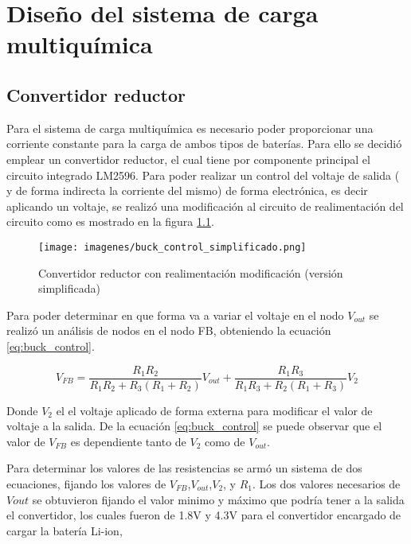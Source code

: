 \chapter{Diseño del sistema de carga multiquímica}

\section{Convertidor reductor}

Para el sistema de carga multiquímica es necesario poder proporcionar una 
corriente constante para la carga de ambos tipos de baterías. Para ello
se decidió emplear un convertidor reductor, el cual tiene por componente principal
el circuito integrado LM2596. Para poder realizar un control del voltaje de salida ( y de
forma indirecta la corriente del mismo)
de forma electrónica, es decir aplicando un voltaje, se realizó una modificación al circuito
de realimentación del circuito como es mostrado en la figura \ref{fig:buck_modificado}.

\begin{figure}[H]
    \centering
    \texttt{[image: imagenes/buck\_control\_simplificado.png]}
    \caption{Convertidor reductor con realimentación modificación (versión simplificada) }
    \label{fig:buck_modificado}
\end{figure}

Para poder determinar en que forma va a variar el voltaje en el nodo $V_{out}$ se realizó un 
análisis de nodos en el nodo FB, obteniendo la ecuación \ref*{eq:buck_control}.

\begin{equation}
    V_{FB} = \frac{R_1R_2}{R_1R_2+R_3(R_1+R_2)} V_{out} + \frac{R_1R_3}{R_1R_3+R_2(R_1+R_3)} V_2
    \label{eq:buck_control}
\end{equation}

Donde $V_2$ el el voltaje aplicado de forma externa para modificar el valor de voltaje a la salida.
De la ecuación \ref*{eq:buck_control} se puede observar que el valor de $V_{FB}$ es dependiente tanto
de $V_2$ como de $V_{out}$.

Para determinar los valores de las resistencias se armó un sistema de dos ecuaciones, fijando los valores 
de $V_{FB}$,$V_{out}$,$V_2$, y $R_1$. Los dos valores necesarios de $V{out}$ se obtuvieron fijando el 
valor minimo y máximo que podría tener a la salida el convertidor, los cuales fueron de 1.8V y 4.3V para 
el convertidor encargado de cargar la batería Li-ion,